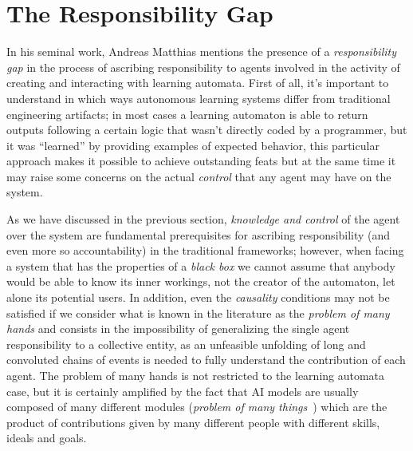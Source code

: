 \section{The Responsibility Gap}\label{sec:responsibilitygap}

In his seminal work, Andreas Matthias mentions the presence of a \textit{responsibility gap} \parencite{MATTRG} in the process of ascribing responsibility to agents involved in the activity of creating and interacting with learning automata.
First of all, it's important to understand in which ways autonomous learning systems differ from traditional engineering artifacts; in most cases a learning automaton is able to return outputs following a certain logic that wasn't directly coded by a programmer, but it was ``learned'' by providing examples of expected behavior, this particular approach makes it possible to achieve outstanding feats but at the same time it may raise some concerns on the actual \textit{control} that any agent may have on the system. 

As we have discussed in the previous section, \textit{knowledge and control} of the agent over the system are fundamental prerequisites for ascribing responsibility (and even more so accountability) in the traditional frameworks; however, when facing a system that has the properties of a \textit{black box} we cannot assume that anybody would be able to know its inner workings, not the creator of the automaton, let alone its potential users.
In addition, even the \textit{causality} conditions may not be satisfied if we consider what is known in the literature as the \textit{problem of many hands} \parencite{POPOM, COEAIR, NISAIA} and consists in the impossibility of generalizing the single agent responsibility to a collective entity, as an unfeasible unfolding of long and convoluted chains of events is needed to fully understand the contribution of each agent.
The problem of many hands is not restricted to the learning automata case, but it is certainly amplified by the fact that AI models are usually composed of many different modules (\textit{problem of many things}~\cite{COEAIR}) which are the product of contributions given by many different people with different skills, ideals and goals.

